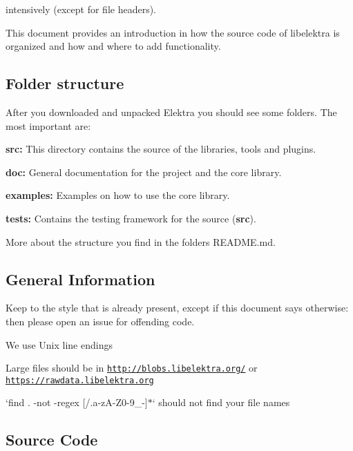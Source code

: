 intensively (except for file headers).

This document provides an introduction in how the source code of libelektra is organized and how and where to add functionality.

\subsection*{Folder structure}

After you downloaded and unpacked Elektra you should see some folders. The most important are\+:


\begin{DoxyItemize}
\item {\bfseries src\+:} This directory contains the source of the libraries, tools and plugins.
\item {\bfseries doc\+:} General documentation for the project and the core library.
\item {\bfseries examples\+:} Examples on how to use the core library.
\item {\bfseries tests\+:} Contains the testing framework for the source ({\bfseries src}).
\end{DoxyItemize}

More about the structure you find in the folder\textquotesingle{}s {\ttfamily R\+E\+A\+D\+M\+E.\+md}.

\subsection*{General Information}


\begin{DoxyItemize}
\item Keep to the style that is already present, except if this document says otherwise\+: then please open an issue for offending code.
\item We use Unix line endings
\item Large files should be in \href{http://blobs.libelektra.org/}{\tt http\+://blobs.\+libelektra.\+org/} or \href{https://rawdata.libelektra.org}{\tt https\+://rawdata.\+libelektra.\+org}
\item `find . -\/not -\/regex \textquotesingle{}\mbox{[}/.a-\/z\+A-\/\+Z0-\/9\+\_\+-\/\mbox{]}$\ast$\textquotesingle{}` should not find your file names
\end{DoxyItemize}

\subsection*{Source Code}

